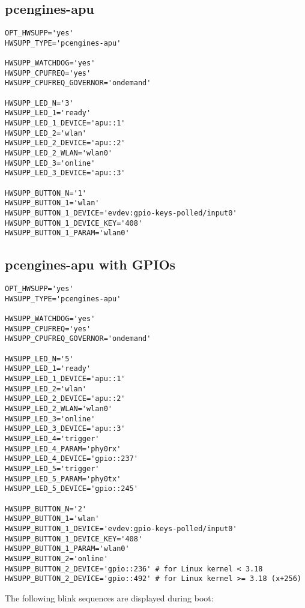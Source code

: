 \subsection{pcengines-apu}

\begin{verbatim}
OPT_HWSUPP='yes'
HWSUPP_TYPE='pcengines-apu'

HWSUPP_WATCHDOG='yes'
HWSUPP_CPUFREQ='yes'
HWSUPP_CPUFREQ_GOVERNOR='ondemand'

HWSUPP_LED_N='3'
HWSUPP_LED_1='ready'
HWSUPP_LED_1_DEVICE='apu::1'
HWSUPP_LED_2='wlan'
HWSUPP_LED_2_DEVICE='apu::2'
HWSUPP_LED_2_WLAN='wlan0'
HWSUPP_LED_3='online'
HWSUPP_LED_3_DEVICE='apu::3'

HWSUPP_BUTTON_N='1'
HWSUPP_BUTTON_1='wlan'
HWSUPP_BUTTON_1_DEVICE='evdev:gpio-keys-polled/input0'
HWSUPP_BUTTON_1_DEVICE_KEY='408'
HWSUPP_BUTTON_1_PARAM='wlan0'
\end{verbatim}

\subsection{pcengines-apu with GPIOs}

\begin{verbatim}
OPT_HWSUPP='yes'
HWSUPP_TYPE='pcengines-apu'

HWSUPP_WATCHDOG='yes'
HWSUPP_CPUFREQ='yes'
HWSUPP_CPUFREQ_GOVERNOR='ondemand'

HWSUPP_LED_N='5'
HWSUPP_LED_1='ready'
HWSUPP_LED_1_DEVICE='apu::1'
HWSUPP_LED_2='wlan'
HWSUPP_LED_2_DEVICE='apu::2'
HWSUPP_LED_2_WLAN='wlan0'
HWSUPP_LED_3='online'
HWSUPP_LED_3_DEVICE='apu::3'
HWSUPP_LED_4='trigger'
HWSUPP_LED_4_PARAM='phy0rx'
HWSUPP_LED_4_DEVICE='gpio::237'
HWSUPP_LED_5='trigger'
HWSUPP_LED_5_PARAM='phy0tx'
HWSUPP_LED_5_DEVICE='gpio::245'

HWSUPP_BUTTON_N='2'
HWSUPP_BUTTON_1='wlan'
HWSUPP_BUTTON_1_DEVICE='evdev:gpio-keys-polled/input0'
HWSUPP_BUTTON_1_DEVICE_KEY='408'
HWSUPP_BUTTON_1_PARAM='wlan0'
HWSUPP_BUTTON_2='online'
HWSUPP_BUTTON_2_DEVICE='gpio::236' # for Linux kernel < 3.18
HWSUPP_BUTTON_2_DEVICE='gpio::492' # for Linux kernel >= 3.18 (x+256)
\end{verbatim}

  The following blink sequences are displayed during boot:
  
